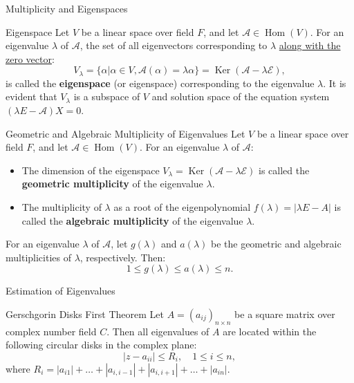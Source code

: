 \documentclass[11pt]{../../TexTemplate/elegantbook} %
\begin{document}
\begin{leftbarTitle}{Multiplicity and Eigenspaces}\end{leftbarTitle}
\begin{definition}{Eigenspace}
    Let \( V \) be a linear space over field \( F \), 
    and let \( \mathcal{A}\in \operatorname{Hom}(V) \).
    For an eigenvalue \( \lambda \) of \( \mathcal{A} \), 
    the set of all eigenvectors corresponding to \( \lambda \) \underline{along with the zero vector}:
    \[
    V_{\lambda} = \{ \alpha | \alpha \in V, \mathcal{A}(\alpha) = \lambda \alpha \} = 
    \operatorname{Ker}(\mathcal{A} - \lambda \mathcal{E}),
    \]
    is called the \textbf{eigenspace} (or eigenspace) corresponding to the eigenvalue \( \lambda \).
    It is evident that \( V_{\lambda} \) is a subspace of \( V \)
    and solution space of the equation system \( ( \lambda E - \mathcal{A})X = 0 \).
\end{definition}

\begin{definition}{Geometric and Algebraic Multiplicity of Eigenvalues}
    Let \( V \) be a linear space over field \( F \), 
    and let \( \mathcal{A}\in \operatorname{Hom}(V) \).
    For an eigenvalue \( \lambda \) of \( \mathcal{A} \):
    \begin{itemize}
        \item The dimension of the eigenspace \( V_{\lambda} = \operatorname{Ker}(\mathcal{A} - \lambda \mathcal{E}) \)
            is called the \textbf{geometric multiplicity} of the eigenvalue \( \lambda \).
        \item The multiplicity of \( \lambda \) as a root of the eigenpolynomial \( f(\lambda) = |\lambda E - A| \)
            is called the \textbf{algebraic multiplicity} of the eigenvalue \( \lambda \).
    \end{itemize}
\end{definition}

\begin{property}
    For an eigenvalue \( \lambda \) of \( \mathcal{A} \),
    let \( g(\lambda) \) and \( a(\lambda) \) be the geometric and algebraic multiplicities of \( \lambda \), respectively.
    Then:
    \[
    1 \leqslant g(\lambda) \leqslant a(\lambda) \leqslant n.
    \]
\end{property}

\begin{leftbarTitle}{Estimation of Eigenvalues}\end{leftbarTitle}
\begin{theorem}{Gerschgorin Disks First Theorem}
    Let \( A = (a_{ij})_{n \times n}\) be a square matrix over complex number field \( C \).
    Then all eigenvalues of \( A \) are located within the following circular disks in the complex plane:
    \[
    |z - a_{ii}| \leq R_i, \quad 1 \leq i \leq n,
    \]
    where \(R_i = |a_{i1}| + \dots + |a_{i,i-1}| + |a_{i,i+1}| + \dots + |a_{in}|\).
\end{theorem}
\end{document}
